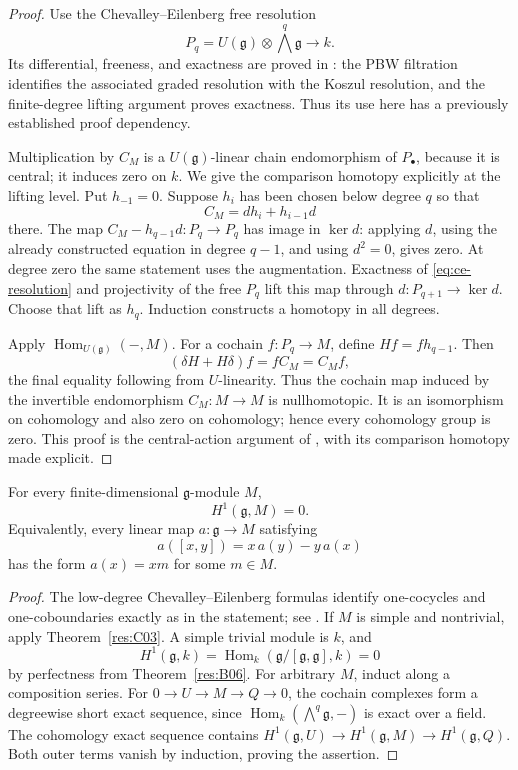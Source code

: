 \begin{proof}
Use the Chevalley--Eilenberg free resolution
\[
 P_q=U(\mathfrak g)\otimes\bigwedge^q\mathfrak g
       \longrightarrow k.
 \tag{3.5}\label{eq:ce-resolution}
\]
Its differential, freeness, and exactness are
proved in \cite[Chapter 6, A06--A07]{homological}:
the PBW filtration identifies the associated graded
resolution with the Koszul resolution, and the
finite-degree lifting argument proves exactness.
Thus its use here has a previously established
proof dependency.

Multiplication by \(C_M\) is a \(U(\mathfrak g)\)-linear
chain endomorphism of \(P_\bullet\), because it is
central; it induces zero on \(k\).
We give the comparison homotopy explicitly at the
lifting level. Put \(h_{-1}=0\). Suppose \(h_i\)
has been chosen below degree \(q\) so that
\[
 C_M=d h_i+h_{i-1}d
\]
there. The map
\(C_M-h_{q-1}d:P_q\to P_q\) has image in
\(\ker d\): applying \(d\), using the already
constructed equation in degree \(q-1\), and using
\(d^2=0\), gives zero. At degree zero the same
statement uses the augmentation. Exactness of
\eqref{eq:ce-resolution} and projectivity of the
free \(P_q\) lift this map through
\(d:P_{q+1}\to\ker d\). Choose that lift as \(h_q\).
Induction constructs a homotopy in all degrees.

Apply \(\operatorname{Hom}_{U(\mathfrak g)}(-,M)\).
For a cochain \(f:P_q\to M\), define
\(Hf=f h_{q-1}\).
Then
\[
 (\delta H+H\delta)f=f C_M=C_M f,
\]
the final equality following from \(U\)-linearity.
Thus the cochain map induced by the invertible
endomorphism \(C_M:M\to M\) is nullhomotopic.
It is an isomorphism on cohomology and also zero
on cohomology; hence every cohomology group is zero.
This proof is the central-action argument of
\cite[Theorem 7.8.9]{weibel}, with its comparison
homotopy made explicit.
\end{proof}

\begin{theorem}\label{res:C04}
For every finite-dimensional \(\mathfrak g\)-module \(M\),
\[
 H^1(\mathfrak g,M)=0.
 \tag{3.6}\label{eq:whitehead-first}
\]
Equivalently, every linear map \(a:\mathfrak g\to M\)
satisfying
\[
 a([x,y])=x\,a(y)-y\,a(x)
\]
has the form \(a(x)=xm\) for some \(m\in M\).
\end{theorem}

\begin{proof}
The low-degree Chevalley--Eilenberg formulas identify
one-cocycles and one-coboundaries exactly as in the
statement; see \cite[Chapter 6, A08]{homological}.
If \(M\) is simple and nontrivial, apply
Theorem~\ref{res:C03}. A simple trivial module is \(k\),
and
\[
 H^1(\mathfrak g,k)=
 \operatorname{Hom}_k(\mathfrak g/[\mathfrak g,\mathfrak g],k)=0
\]
by perfectness from Theorem~\ref{res:B06}.
For arbitrary \(M\), induct along a composition
series. For \(0\to U\to M\to Q\to0\), the cochain
complexes form a degreewise short exact sequence,
since \(\operatorname{Hom}_k(\bigwedge^q\mathfrak g,-)\)
is exact over a field. The cohomology exact sequence
contains
\(H^1(\mathfrak g,U)\to H^1(\mathfrak g,M)
\to H^1(\mathfrak g,Q)\).
Both outer terms vanish by induction, proving the
assertion.
\end{proof}

